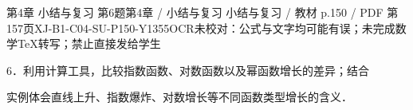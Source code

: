 \begin{bankitem}{第4章 小结与复习 第6题}{第4章 / 小结与复习 小结与复习 / 教材 p.150 / PDF 第157页}{XJ-B1-C04-SU-P150-Y1355}{OCR未校对：公式与文字均可能有误；未完成数学TeX转写；禁止直接发给学生}
\begin{ocrdraft}
\par
6．利用计算工具，比较指数函数、对数函数以及幂函数增长的差异；结合
\par
实例体会直线上升、指数爆炸、对数增长等不同函数类型增长的含义．
\end{ocrdraft}
\end{bankitem}
